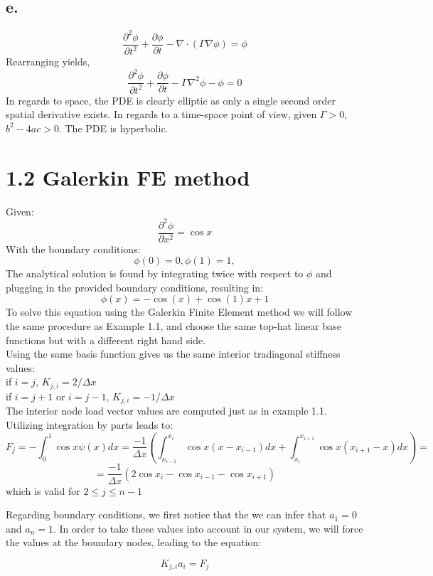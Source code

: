 \documentclass[11pt]{article}
\begin{document}
\subsection{\textbf{e.}}
\label{sec-1-5}
\[
\frac{\partial^{2} \phi}{\partial t^{2}} + \frac{\partial \phi}{\partial t} - \nabla \cdot \left(\Gamma \nabla \phi \right) = \phi
\]
Rearranging yields,
\[
\frac{\partial^{2} \phi}{\partial t^{2}} + \frac{\partial \phi}{\partial t} - \Gamma \nabla^{2} \phi - \phi = 0
\]
In regards to space, the PDE is clearly elliptic as only a single second order spatial derivative exists. In regards to a time-space point of view, given $\Gamma > 0$,  $b^{2} -4ac > 0$. The PDE is hyperbolic.
\newpage

\section{1.2 Galerkin FE method}
\label{sec-2}
Given: 
\[
\frac{\partial^{2} \phi}{\partial x^{2}} = \cos x
\]
With the boundary conditions:
\[
 \phi \left( 0 \right) = 0, \phi \left( 1 \right) = 1, 
\]
The analytical solution is found by integrating twice with respect to $\phi$ and plugging in the provided boundary conditions, resulting in:
\[
\phi(x) = -\cos(x) +  \cos(1) x +1
\]
To solve this equation using the Galerkin Finite Element method we will follow the same procedure as Example 1.1, and choose the same top-hat linear base functions but with a different right hand side.\\
Using the same basis function gives us the same interior tradiagonal stiffness values: \\
if $i=j$, $K_{j,i} = 2 / \Delta x$ \\
if $i = j+1$ or $i = j-1$, $K_{j,i} = -1 / \Delta x$ \\
The interior node load vector values are computed just as in example 1.1. Utilizing integration by parts leads to:
\[
F_{j}=-\int_{0}^{1} \cos x \psi(x)dx = \frac{-1}{\Delta x} \left(\int_{x_{i-1}}^{x_{i}} \cos x \left(x -x_{i-1} \right)dx + \int_{x_{i}}^{x_{i+1}} \cos x \left(x_{i+1} -x \right)dx \right) =
\]
\[
= \frac{-1}{\Delta x} \left( 2\cos x_{i}  - \cos x_{i-1}  - \cos x_{i+1}\right)
\] 
which is valid for $2 \leq j \leq n-1$

Regarding boundary conditions, we first notice that the we can infer that $a_{1}=0$ and $a_{n}=1$.
In order to take these values into account in our system, we will force the values at the boundary nodes, leading to the equation: 

\[
K_{j,i}a_{i}=F_{j}
\]
\end{document}
